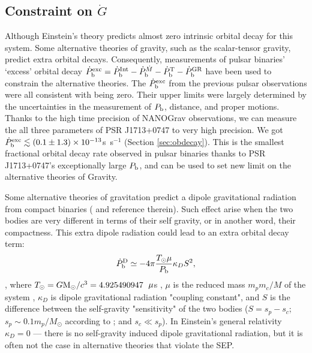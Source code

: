 \subsection{Constraint on $\dot{G}$}
\label{sec:Gdot}
Although Einstein's theory predicts almost zero intrinsic orbital decay for
this system.
Some alternative theories of gravity, such as the scalar-tensor gravity,
predict extra orbital decays.
Consequently, measurements of pulsar binaries' `excess' orbital decay
$\dot{P}_{\rm b}^{\rm exc}=\dot{P}_{\rm b}^{\rm Int} - \dot{P}_{\rm
b}^{\dot{M}}  - \dot{P}_{\rm b}^{\rm T} - \dot{P}_{\rm b}^{\rm GR}$ have been
used to constrain the alternative theories\citep{lwj+09, fwe+12}. 
The $\dot{P}_{\rm b}^{\rm exc}$ from the previous pulsar
observations were all consistent with being zero. Their upper limits were
largely determined by the uncertainties in the measurement of $P_{\rm b}$,
distance, and proper motions.
Thanks to the high time precision of NANOGrav observations, we can measure the
all three parameters of PSR J1713+0747 to very high precision. We got
$\dot{P}_{\rm b}^{\rm exc}\lesssim(0.1\pm1.3)\times10^{-13}$s~s$^{-1}$ (Section
\ref{sec:obdecay}). 
This is the smallest fractional orbital decay rate observed in pulsar binaries
thanks to PSR J1713+0747's exceptionally large $P_{\rm b}$, and can be used to
set new limit on the alternative theories of Gravity.

Some alternative theories of gravitation predict a dipole gravitational
radiation from compact binaries (\citealt{Will93, Will01, lwj+09, fwe+12} and reference therein). Such effect arise when the two bodies are very different in terms of their self gravity, or in another word, their compactness.
This extra dipole radiation could lead to an extra orbital decay term:
\begin{equation}
\dot{P}_{\rm b}^{\rm D} \simeq -4\pi\frac{T_{\odot}\mu}{P_{\rm b}}\kappa_D S^2,
\end{equation}
\citep{lwj+09}, where $T_{\odot}=G{\rm M_{\odot}}/c^3=4.925490947$~${\rm
\mu}$s \citep{lk05}, $\mu$ is the reduced mass $m_pm_c/M$ of the system , $\kappa_D $ is dipole
gravitational radiation "coupling constant", and $S$ is the difference
between the self-gravity "sensitivity" of the two bodies ($S = s_p - s_c$;
$s_p\sim0.1m_p/M_{\odot}$ according to \citealt{de92} ; and $s_c\ll s_p$).
In Einstein's general relativity $\kappa_D=0$ --- there is no self-gravity induced
dipole gravitational radiation, but it is often not the case in alternative
theories that violate the SEP.

